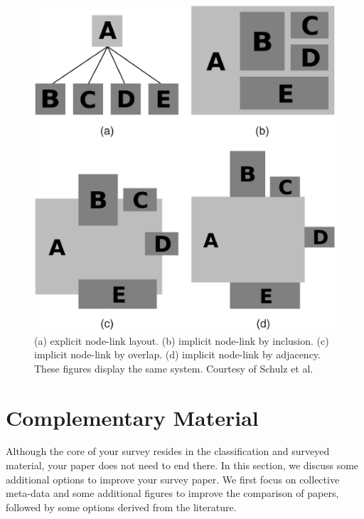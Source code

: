 \begin{figure}
\centering
\includegraphics[width=0.8\linewidth]{pictures/5473227-fig-2-source-hires.png}
\caption{(a) explicit node-link layout. (b) implicit node-link by inclusion. (c)  implicit node-link by overlap. (d)  implicit node-link by adjacency. These figures display the same system. Courtesy of Schulz et al. \cite{schulz2011design}} \label{fig:compare}
\end{figure}

\section{Complementary Material}
Although the core of your survey resides in the classification and surveyed material, your paper does not need to end there. In this section, we discuss some additional options to improve your survey paper. We first focus on collective meta-data and some additional figures to improve the comparison of papers, followed by some options derived from the literature.


